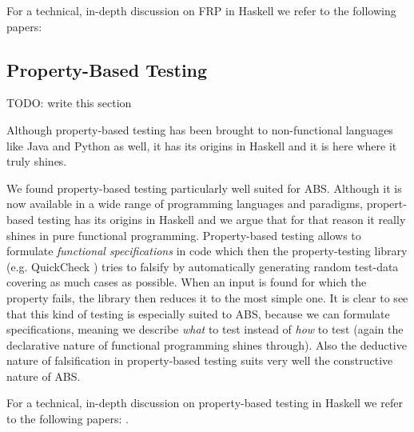 For a technical, in-depth discussion on FRP in Haskell we refer to the following papers: \citep{wan_functional_2000, hughes_generalising_2000, hughes_programming_2005, nilsson_functional_2002, hudak_arrows_2003, courtney_yampa_2003, perez_functional_2016, perez_extensible_2017}

\subsection{Property-Based Testing}
TODO: write this section

Although property-based testing has been brought to non-functional languages like Java and Python as well, it has its origins in Haskell and it is here where it truly shines.

We found property-based testing particularly well suited for ABS. Although it is now available in a wide range of programming languages and paradigms, propert-based testing has its origins in Haskell \citep{claessen_quickcheck:_2000, claessen_testing_2002} and we argue that for that reason it really shines in pure functional programming. Property-based testing allows to formulate \textit{functional specifications} in code which then the property-testing library (e.g. QuickCheck \citep{claessen_quickcheck:_2000}) tries to falsify by automatically generating random test-data covering as much cases as possible. When an input is found for which the property fails, the library then reduces it to the most simple one. It is clear to see that this kind of testing is especially suited to ABS, because we can formulate specifications, meaning we describe \textit{what} to test instead of \textit{how} to test (again the declarative nature of functional programming shines through). Also the deductive nature of falsification in property-based testing suits very well the constructive nature of ABS.

For a technical, in-depth discussion on property-based testing in Haskell we refer to the following papers: \citep{claessen_quickcheck:_2000, claessen_testing_2002}.

